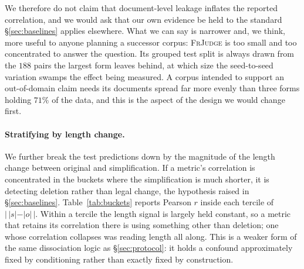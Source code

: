 \documentclass[11pt]{article}
\begin{document}
We therefore do not claim that document-level leakage inflates the reported
correlation, and we would ask that our own evidence be held to the standard
\S\ref{sec:baselines} applies elsewhere. What we can say is narrower and, we
think, more useful to anyone planning a successor corpus: \textsc{FrJudge} is
too small and too concentrated to answer the question. Its grouped test split is
always drawn from the $188$ pairs the largest form leaves behind, at which size
the seed-to-seed variation swamps the effect being measured. A corpus intended
to support an out-of-domain claim needs its documents spread far more evenly
than three forms holding $71\%$ of the data, and this is the aspect of the
design we would change first.

\paragraph{Stratifying by length change.}
We further break the test predictions down by the magnitude of the length change
between original and simplification. If a metric's correlation is concentrated
in the buckets where the simplification is much shorter, it is detecting
deletion rather than legal change, the hypothesis raised in
\S\ref{sec:baselines}. Table~\ref{tab:buckets} reports Pearson $r$ inside each
tercile of $|\,|s|-|o|\,|$. Within a tercile the length signal is largely held
constant, so a metric that retains its correlation there is using something
other than deletion; one whose correlation collapses was reading length all
along. This is a weaker form of the same dissociation logic as
\S\ref{sec:protocol}: it holds a confound approximately fixed by conditioning
rather than exactly fixed by construction.

\begin{table}[t]\centering\small

\caption{Correlation with the human label \emph{within} terciles of the
absolute length change, pooling test predictions over seeds. Restricting to a
tercile removes most of the length variance; a metric that measures legal
meaning should degrade far less than one that measures deletion.}
\label{tab:buckets}
\end{table}
\end{document}
